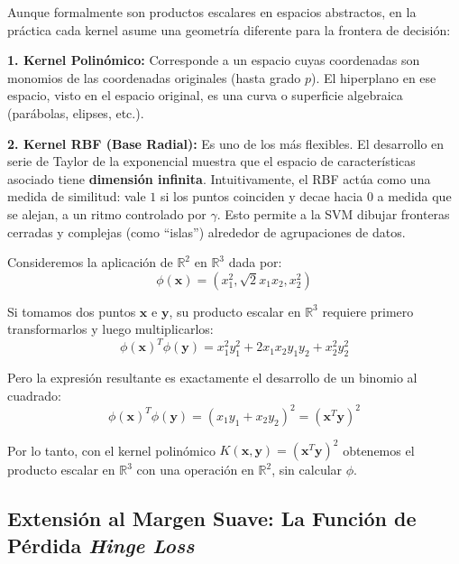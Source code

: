 \documentclass[12pt, a4paper]{article}
\begin{document}
\begin{tcolorbox}[colback=blue!5!white,colframe=blue!75!black,title=\textbf{Nota Aclaratoria: ¿Qué hacen estos Kernels en la práctica?}]
Aunque formalmente son productos escalares en espacios abstractos, en la práctica cada kernel asume una geometría diferente para la frontera de decisión:

\textbf{1. Kernel Polinómico:}
Corresponde a un espacio cuyas coordenadas son monomios de las coordenadas originales (hasta grado $p$). El hiperplano en ese espacio, visto en el espacio original, es una curva o superficie algebraica (parábolas, elipses, etc.).

\textbf{2. Kernel RBF (Base Radial):}
Es uno de los más flexibles. El desarrollo en serie de Taylor de la exponencial muestra que el espacio de características asociado tiene \textbf{dimensión infinita}. Intuitivamente, el RBF actúa como una medida de similitud: vale $1$ si los puntos coinciden y decae hacia $0$ a medida que se alejan, a un ritmo controlado por $\gamma$. Esto permite a la SVM dibujar fronteras cerradas y complejas (como ``islas'') alrededor de agrupaciones de datos.
\end{tcolorbox}

\begin{tcolorbox}[colback=cyan!5!white,colframe=cyan!75!black,title=\textbf{Ejemplo: La magia del Kernel}]
Consideremos la aplicación de $\mathbb{R}^2$ en $\mathbb{R}^3$ dada por:
\[ \phi(\mathbf{x}) = (x_1^2, \sqrt{2}x_1 x_2, x_2^2) \]

Si tomamos dos puntos $\mathbf{x}$ e $\mathbf{y}$, su producto escalar en $\mathbb{R}^3$ requiere primero transformarlos y luego multiplicarlos:
\[ \phi(\mathbf{x})^T \phi(\mathbf{y}) = x_1^2 y_1^2 + 2x_1 x_2 y_1 y_2 + x_2^2 y_2^2 \]

Pero la expresión resultante es exactamente el desarrollo de un binomio al cuadrado:
\[ \phi(\mathbf{x})^T \phi(\mathbf{y}) = (x_1 y_1 + x_2 y_2)^2 = (\mathbf{x}^T \mathbf{y})^2 \]

Por lo tanto, con el kernel polinómico $K(\mathbf{x}, \mathbf{y}) = (\mathbf{x}^T \mathbf{y})^2$ obtenemos el producto escalar en $\mathbb{R}^3$ con una operación en $\mathbb{R}^2$, sin calcular $\phi$.
\end{tcolorbox}

\subsection{Extensión al Margen Suave: La Función de Pérdida \textit{Hinge Loss}}
\end{document}
